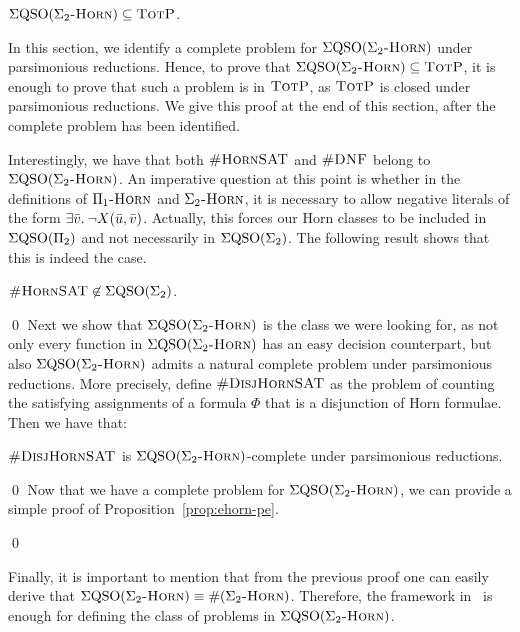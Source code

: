 \begin{prop}\label{prop:ehorn-pe}
$\Sigma{\rm QSO}(\Sigma_2\textsc{-Horn}) \subseteq \text{\sc TotP}$.
\end{prop}
In this section, we identify a complete problem for $\Sigma{\rm QSO}(\Sigma_2\textsc{-Horn})$ under parsimonious reductions. Hence, to prove that $\Sigma{\rm QSO}(\Sigma_2\textsc{-Horn}) \subseteq \text{\sc TotP}$, it is enough to prove that such a problem is in $\text{\sc TotP}$, as $\text{\sc TotP}$ is closed under parsimonious reductions. We give this proof at the end of this section, after the complete problem has been identified.

Interestingly, we have that both $\textsc{\#HornSAT}$ and $\textsc{\#DNF}$ belong to $\Sigma{\rm QSO}(\Sigma_2\textsc{-Horn})$. 
An imperative question at this point is whether in the definitions of $\Pi_1\textsc{-Horn}$ and $\Sigma_2\textsc{-Horn}$, it is necessary to allow negative literals of the form $\exists{\bar{v}}.\: \neg X(\bar{u},\bar{v})$. Actually, this forces our Horn classes to be included in $\Sigma{\rm QSO}(\Pi_{2})$ and not necessarily in $\Sigma{\rm QSO}(\Sigma_{2})$. The following result shows that this is indeed the case.

\begin{prop}\label{prop:hsat-not-sigma2}	
$\textsc{\#HornSAT} \not\in \Sigma{\rm QSO}(\Sigma_{2})$.
\end{prop}
\proof

\qed
Next we show that $\Sigma{\rm QSO}(\Sigma_2\textsc{-Horn})$ is the class we were looking for, as not only every function in $\Sigma{\rm QSO}(\Sigma_2\textsc{-Horn})$ has an easy decision counterpart, but also $\Sigma{\rm QSO}(\Sigma_2\textsc{-Horn})$ admits a natural complete problem under parsimonious reductions. More precisely, define 
$\textsc{\#DisjHornSAT}$ as the problem of counting the satisfying assignments of a formula $\Phi$ that is a disjunction of Horn formulae. Then we have that:

\begin{thm} \label{sigma2hard}
	$\textsc{\#DisjHornSAT}$ is $\Sigma{\rm QSO}(\Sigma_2\textsc{-Horn})$-complete under parsimonious reductions. 
\end{thm}
\proof

\qed
Now that we have a complete problem for $\Sigma{\rm QSO}(\Sigma_2\textsc{-Horn})$, we can provide a simple proof of Proposition~\ref{prop:ehorn-pe}.

\medskip


\qed

Finally, it is important to mention that from the previous proof one can easily derive that $\Sigma{\rm QSO}(\Sigma_2\textsc{-Horn}) \equiv \#(\Sigma_2\textsc{-Horn})$. Therefore, the framework in~\cite{SalujaST95} is enough for defining the class of problems in $\Sigma{\rm QSO}(\Sigma_2\textsc{-Horn})$.